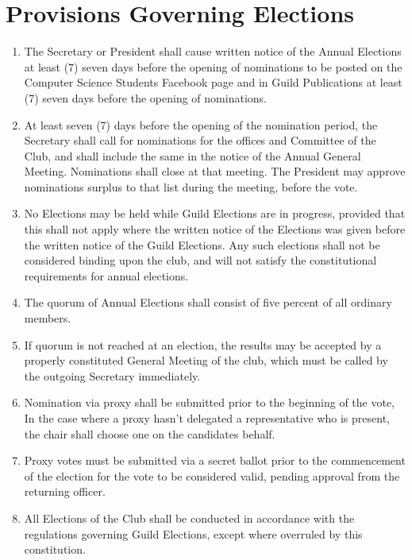 \documentclass[10pt,a4paper]{report}
\begin{document}
	\section{Provisions Governing Elections}
		\begin{enumerate}[label=\alph*]
			\item The Secretary or President shall cause written notice of the Annual Elections at least (7) seven days before the opening of nominations to be posted on the Computer Science Students Facebook page and in Guild Publications at least (7) seven days before the opening of nominations.
			\item At least seven (7) days before the opening of the nomination period, the Secretary shall call for nominations for the offices and Committee of the Club, and shall include the same in the notice of the Annual General Meeting. Nominations shall close at that meeting. The President may approve nominations surplus to that list during the meeting, before the vote.
			\item No Elections may be held while Guild Elections are in progress, provided that this shall not apply where the written notice of the Elections was given before the written notice of the Guild Elections. Any such elections shall not be considered binding upon the club, and will not satisfy the constitutional requirements for annual elections.
			\item The quorum of Annual Elections shall consist of five percent of all ordinary members.
			\item If quorum is not reached at an election, the results may be accepted by a properly constituted General Meeting of the club, which must be called by the outgoing Secretary immediately.
			\item Nomination via proxy shall be submitted prior to the beginning of the vote, In the case where a proxy hasn't delegated a representative who is present, the chair shall choose one on the candidates behalf.
			\item Proxy votes must be submitted via a secret ballot prior to the commencement of the election for the vote to be considered valid, pending approval from the returning officer.
			\item All Elections of the Club shall be conducted in accordance with the regulations governing Guild Elections, except where overruled by this constitution.
		\end{enumerate}
	
\end{document}
